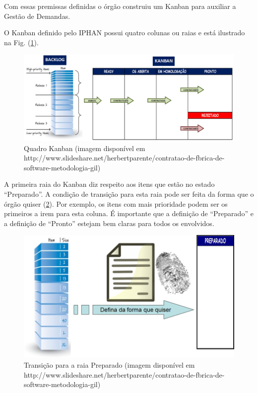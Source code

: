 Com essas premissas definidas o órgão construiu um Kanban para auxiliar a Gestão de Demandas. 

O Kanban definido pelo IPHAN possui quatro colunas ou raias e está ilustrado na Fig. (\ref{kanban1}).

\begin{figure}[H]
		\centering
		
			\includegraphics[scale=0.5]{figuras/kanbanIPHAN1.png}
		\caption{Quadro Kanban (imagem disponível em http://www.slideshare.net/herbertparente/contratao-de-fbrica-de-software-metodologia-gil)}
	\label{kanban1}
\end{figure}

A primeira raia do Kanban diz respeito aos itens que estão no estado “Preparado”. A condição de transição para esta raia pode ser feita da forma que o órgão quiser (\ref{kanban2}). Por exemplo, os itens com mais prioridade podem ser os primeiros a irem para esta coluna. É importante que a definição de “Preparado” e a definição de “Pronto” estejam bem claras para todos os envolvidos.  

\begin{figure}[H]
		\centering
		
			\includegraphics[scale=0.5]{figuras/kanbanIPHAN2.png}
		\caption{Transição para a raia Preparado (imagem disponível em http://www.slideshare.net/herbertparente/contratao-de-fbrica-de-software-metodologia-gil)}
		\label{kanban2}
\end{figure}

